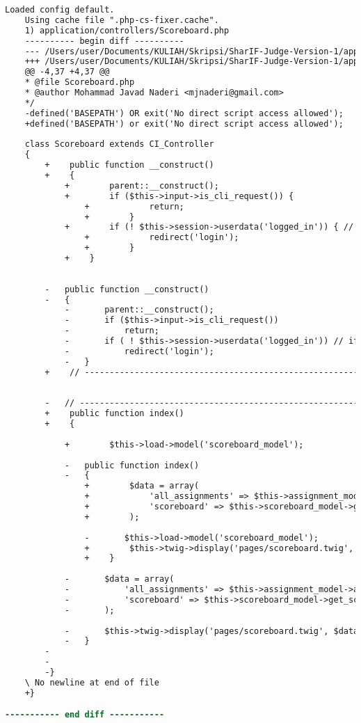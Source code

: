 \begin{lstlisting}[language=diff, caption=Perubahan pada kode Scoreboard.php]
	Loaded config default.
	Using cache file ".php-cs-fixer.cache".
	1) application/controllers/Scoreboard.php
	---------- begin diff ----------
	--- /Users/user/Documents/KULIAH/Skripsi/SharIF-Judge-Version-1/application/controllers/Scoreboard.php
	+++ /Users/user/Documents/KULIAH/Skripsi/SharIF-Judge-Version-1/application/controllers/Scoreboard.php
	@@ -4,37 +4,37 @@
	* @file Scoreboard.php
	* @author Mohammad Javad Naderi <mjnaderi@gmail.com>
	*/
	-defined('BASEPATH') OR exit('No direct script access allowed');
	+defined('BASEPATH') or exit('No direct script access allowed');
	
	class Scoreboard extends CI_Controller
	{
		+    public function __construct()
		+    {
			+        parent::__construct();
			+        if ($this->input->is_cli_request()) {
				+            return;
				+        }
			+        if (! $this->session->userdata('logged_in')) { // if not logged in
				+            redirect('login');
				+        }
			+    }
		
		
		-	public function __construct()
		-	{
			-		parent::__construct();
			-		if ($this->input->is_cli_request())
			-			return;
			-		if ( ! $this->session->userdata('logged_in')) // if not logged in
			-			redirect('login');
			-	}
		+    // ------------------------------------------------------------------------
		
		
		-	// ------------------------------------------------------------------------
		+    public function index()
		+    {
			
			+        $this->load->model('scoreboard_model');
			
			-	public function index()
			-	{
				+        $data = array(
				+            'all_assignments' => $this->assignment_model->all_assignments(),
				+            'scoreboard' => $this->scoreboard_model->get_scoreboard($this->user->selected_assignment['id'])
				+        );
				
				-		$this->load->model('scoreboard_model');
				+        $this->twig->display('pages/scoreboard.twig', $data);
				+    }
			
			-		$data = array(
			-			'all_assignments' => $this->assignment_model->all_assignments(),
			-			'scoreboard' => $this->scoreboard_model->get_scoreboard($this->user->selected_assignment['id'])
			-		);
			
			-		$this->twig->display('pages/scoreboard.twig', $data);
			-	}
		-
		-
		-}
	\ No newline at end of file
	+}

----------- end diff -----------
\end{lstlisting}

